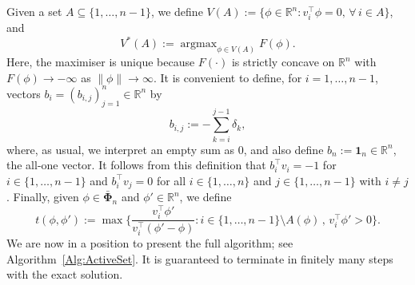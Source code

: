 \documentclass[a4paper,12pt]{article}
\DeclareMathOperator*{\argmax}{argmax}
\begin{document}
Given a set $A \subseteq \{1,\ldots,n-1\}$, we define $V(A) := \bigl \{ \phi \in \mathbb{R}^n : v_i^\top\phi = 0, \, \forall \, i \in A\bigr\}$, and 
  \begin{equation}
    \label{Eq:OptimizationFixedA}
    V^*(A) := \argmax_{\phi \in V(A)} F(\phi).
  \end{equation}
Here, the maximiser is unique because $F(\cdot )$ is strictly concave on $\mathbb{R}^n$ with $F(\phi) \rightarrow -\infty$ as $\|\phi\| \rightarrow \infty$. It is convenient to define, for $i=1,\ldots,n-1$, vectors $b_i = (b_{i,j})_{j=1}^n \in \mathbb{R}^n$ by
\[
b_{i,j} := - \sum_{k=i}^{j-1} \delta_k,
\]
where, as usual, we interpret an empty sum as $0$, and also define $b_n := \mathbf{1}_n \in \mathbb{R}^n$, the all-one vector.  It follows from this definition that $b_i^{\top} v_i = -1$ for $i\in\{1,\ldots,n-1\}$ and $ b_i^\top v_j = 0$ for all $i \in \{1,\ldots,n\}$ and $j \in \{1,\ldots,n-1\}$ with $i \neq j$.  Finally, given $\phi \in \bar{\mathbf{\Phi}}_n$ and $\phi' \in \mathbb{R}^n$, we define 
\[
t(\phi, \phi') := \max\biggl\{\frac{v_i^\top \phi'}{ v_i^\top(\phi' - \phi)}:i \in \{1,\ldots,n-1\} \setminus A(\phi)\, , \, v_i^\top\phi' > 0\biggr\}.
\] 
We are now in a position to present the full algorithm; see Algorithm~\ref{Alg:ActiveSet}.  It is guaranteed to terminate in finitely many steps with the exact solution.   
\end{document}

